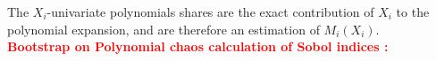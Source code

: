The $X_i$-univariate polynomials shares are the exact contribution of $X_i$ to the polynomial expansion, and are therefore an estimation of $M_i(X_i)$. \\

\textcolor{red}{\textbf{Bootstrap on Polynomial chaos calculation of Sobol indices :} } \\



